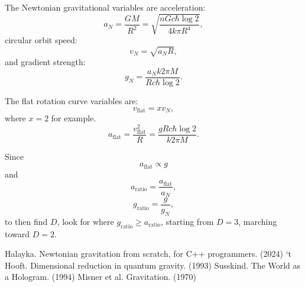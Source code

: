 \documentclass[12pt]{article}
\begin{document}
The Newtonian gravitational variables are acceleration:
\begin{equation}
a_N = \frac{G M}{R^2} = \sqrt{\frac{n G c \hbar \log 2}{4 k \pi R^4}},
\end{equation}
circular orbit speed:
\begin{equation}
v_N = \sqrt{a_N R},
\end{equation}
and gradient strength:
\begin{equation}
g_N = \frac{a_N k 2 \pi M}{R c \hbar \log 2}. 
\end{equation}

The flat rotation curve variables are:
\begin{equation}
v_{\textrm{flat}} = x v_N,
\end{equation}
where $x = 2$ for example.
\begin{equation}
a_{\textrm{flat}} = \frac{v_{\textrm{flat}}^2}{R} = \frac{g R c \hbar \log 2}{k 2 \pi M}.
\end{equation}

Since
\begin{equation}
a_{\textrm{flat}} \propto g
\end{equation}
and
\begin{equation}
a_{\textrm{ratio}} = \frac{a_{\textrm{flat}}}{a_N},
\end{equation}
\begin{equation}
g_{\textrm{ratio}} = \frac{g}{g_N},
\end{equation}
to then find $D$, look for where $g_{\textrm{ratio}} \geq a_{\textrm{ratio}}$, starting from $D = 3$, marching toward $D = 2$.






\begin{thebibliography}{9}

 Halayka. Newtonian gravitation from scratch, for C++ programmers. (2024)
 `t Hooft. Dimensional reduction in quantum gravity. (1993)
 Susskind. The World as a Hologram. (1994)
 Misner et al. Gravitation. (1970)

\end{thebibliography}



\pagebreak
\end{document}
